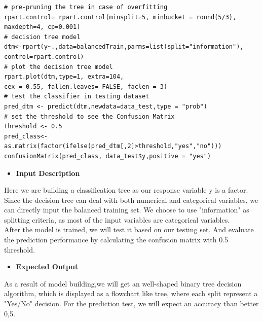 	\begin{lstlisting}
# pre-pruning the tree in case of overfitting
rpart.control= rpart.control(minsplit=5, minbucket = round(5/3), maxdepth=4, cp=0.001)
# decision tree model
dtm<-rpart(y~.,data=balancedTrain,parms=list(split="information"),  control=rpart.control)
# plot the decision tree model
rpart.plot(dtm,type=1, extra=104,
cex = 0.55, fallen.leaves= FALSE, faclen = 3)
# test the classifier in testing dataset
pred_dtm <- predict(dtm,newdata=data_test,type = "prob")
# set the threshold to see the Confusion Matrix
threshold <- 0.5
pred_class<-as.matrix(factor(ifelse(pred_dtm[,2]>threshold,"yes","no")))
confusionMatrix(pred_class, data_test$y,positive = "yes")
	\end{lstlisting}
	\begin{itemize}
	\item \textbf{Input Description}
	\end{itemize}
	\indent Here we are building a classification tree as our response variable y is a factor. Since the decision tree can deal with both numerical and categorical variables, we can directly input the balanced training set. We choose to use "information" as splitting criteria, as most of the input variables are categorical variables. \\
	[\baselineskip]\noindent After the model is trained, we will test it based on our testing set. And evaluate the prediction performance by calculating the confusion matrix with 0.5 threshold.
	
	 \begin{itemize}
		\item \textbf{Expected Output}
	 \end{itemize}
 	 \indent As a result of model building,we will get an well-shaped binary tree decision algorithm, which is displayed as a flowchart like tree, where each split represent a "Yes/No" decision. For the prediction test, we will expect an accuracy than better 0,5.
 
